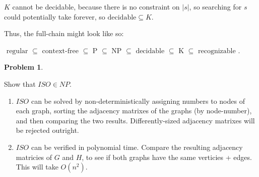 \documentclass[11pt]{article}
\theoremstyle{definition}
\theoremstyle{case}
\theoremstyle{theorem}
\newtheorem{prob}{Problem}
\begin{document}
$K$ cannot be decidable, because there is no constraint on $|s|$, so searching for $s$ could
potentially take forever, so $\text{decidable} \subseteq K$.

Thus, the full-chain might look like so:

$\text{ regular } \subseteq \text{ context-free } \subseteq \text{ P } \subseteq \text{ NP } \subseteq \text{ decidable } \subseteq \text{ K } \subseteq \text{ recognizable }$.  

\begin{prob}\end{prob}

Show that $ISO \in NP$. 

\begin{enumerate}[label=(\arabic*)]

\item

$ISO$ can be solved by non-deterministically assigning numbers to nodes of each graph, 
sorting the adjacency matrixes of the graphs (by node-number), and then comparing the two results. 
Differently-sized adjacency matrixes will be rejected outright.

\item

$ISO$ can be verified in polynomial time. Compare the resulting adjacency matricies of $G$ and $H$,
to see if both graphs have the same verticies + edges. This will take $O(n^2)$. 

\end{enumerate}
\end{document}
